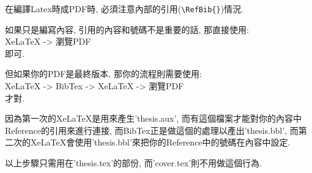 

\newpage
{}

在編譯Latex時成PDF時, 必須注意內部的引用(\verb|\RefBib{}|)情況.

如果只是編寫內容, 引用的內容和號碼不是重要的話, 那直接使用:\\
XeLaTeX -> 瀏覽PDF\\
即可.

但如果你的PDF是最終版本, 那你的流程則需要使用:\\
XeLaTeX -> BibTex -> XeLaTeX -> 瀏覽PDF\\
才對.

因為第一次的XeLaTeX是用來產生'thesis.aux', 而有這個檔案才能對你的內容中Reference的引用來進行連接, 而BibTex正是做這個的處理以產出'thesis.bbl', 而第二次的XeLaTeX會使用'thesis.bbl'來把你的Reference中的號碼在內容中設定.

以上步驟只需用在'thesis.tex'的部份, 而'cover.tex'則不用做這個行為.

